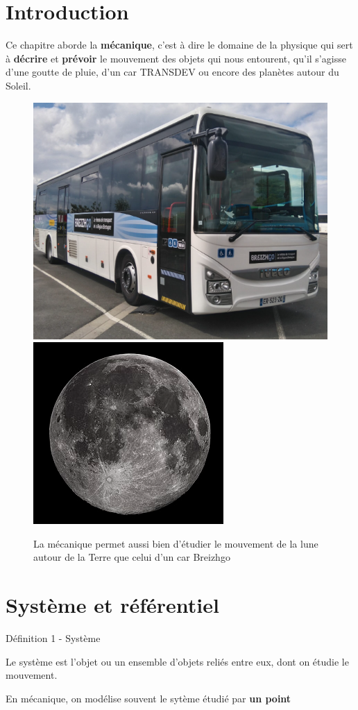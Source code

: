 \documentclass[french, a4paper, 12pt, twocolumn, landscape]{article}
\begin{document}
\section*{Introduction}

Ce chapitre aborde la \textbf{mécanique}, c'est à dire le domaine de la physique qui sert à \textbf{décrire} et \textbf{prévoir} le mouvement des objets qui nous entourent, qu'il s'agisse d'une goutte de pluie, d'un car TRANSDEV ou encore des planètes autour du Soleil.

\begin{figure}[ht]
	\centering
	\includegraphics[width=.14\textwidth]{Transdev.png}\hspace{2cm}
	\includegraphics[width=.11\textwidth]{Lune.png}
	\caption{La mécanique permet aussi bien d'étudier le mouvement de la lune autour de la Terre que celui d'un car Breizhgo}
\end{figure}
\clearpage

\section{Système et référentiel}

\begin{definition}{Définition 1 - Système}

		Le système est l'objet ou un ensemble d'objets reliés entre eux, dont on étudie le mouvement.

\end{definition}

En mécanique, on modélise souvent le sytème étudié par \textbf{un point}

\end{document}
